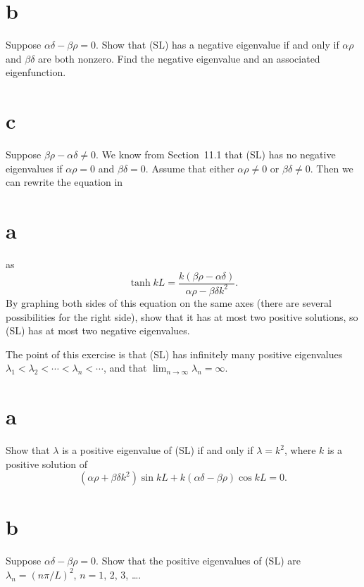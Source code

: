 \begin{exerciselist}
  \part{b} Suppose $\alpha\delta-\beta\rho=0$. Show that (SL) has a negative eigenvalue if and only
  if $\alpha\rho$ and $\beta\delta$ are both nonzero. Find the negative eigenvalue and an associated
  eigenfunction. 

  \part{c} Suppose $\beta\rho-\alpha\delta\ne0$. We know from Section~11.1 that (SL) has no negative
  eigenvalues if $\alpha\rho=0$ and $\beta\delta=0$. Assume that either $\alpha\rho\ne0$ or
  $\beta\delta\ne0$. Then we can rewrite the equation in \part{a} as
  \[
    \tanh kL= \frac{k(\beta\rho-\alpha\delta)}{\alpha\rho-\beta\delta k^{2}}.
  \]
  By graphing both sides of this equation on the same axes (there are several possibilities for the
  right side), show that it has at most two positive solutions, so (SL) has at most two negative
  eigenvalues.

  \item\label{exer:13.2.30} \Lex The point of this exercise is that (SL) has infinitely many
        positive eigenvalues $\lambda_{1}<\lambda_{2}<\cdots<\lambda_{n}<\cdots$, and that
        $\lim_{n\to\infty}\lambda_{n}=\infty$.

  \part{a} Show that $\lambda$ is a positive eigenvalue of (SL) if and only if $\lambda=k^{2}$,
  where $k$ is a positive solution of
  \begin{equation}
    \tag{A}(\alpha\rho+\beta\delta k^{2})\sin kL+k(\alpha\delta-\beta\rho)\cos kL=0.
  \end{equation}

  \part{b} Suppose $\alpha\delta-\beta\rho=0$. Show that the positive eigenvalues of (SL) are
  $\lambda_{n}=(n\pi/L)^{2}$, $n=1$, $2$, $3$, \dots. 


\end{exerciselist}
